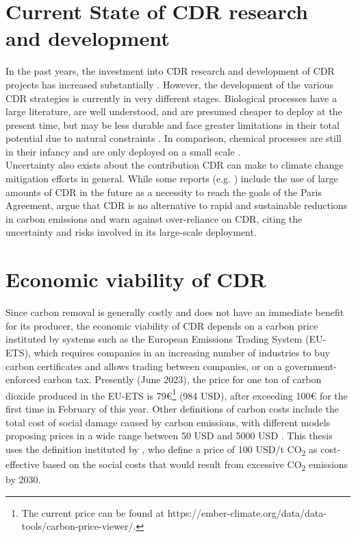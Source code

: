 \section{Current State of CDR research and development}
In the past years, the investment into CDR research and development of CDR projects has increased substantially \parencite{Smith2023TheEdition}. However, the development of the various CDR strategies is currently in very different stages. Biological processes have a large literature, are well understood, and are presumed cheaper to deploy at the present time, but may be less durable and face greater limitations in their total potential due to natural constraints \parencite{Fuss2018NegativeEffects}. In comparison, chemical processes are still in their infancy and are only deployed on a small scale \parencite{Smith2023TheEdition}.\\
Uncertainty also exists about the contribution CDR can make to climate change mitigation efforts in general. While some reports (e.g. \textcite{NAS2018NegativeAgenda}) include the use of large amounts of CDR in the future as a necessity to reach the goals of the Paris Agreement, \textcite{Fuss2018NegativeEffects} argue that CDR is no alternative to rapid and sustainable reductions in carbon emissions and warn against over-reliance on CDR, citing the uncertainty and risks involved in its large-scale deployment.\\
\section{Economic viability of CDR}
Since carbon removal is generally costly and does not have an immediate benefit for its producer, the economic viability of CDR depends on a carbon price instituted by systems such as the European Emissions Trading System (EU-ETS), which requires companies in an increasing number of industries to buy carbon certificates and allows trading between companies, or on a government-enforced carbon tax. Presently (June 2023), the price for one ton of carbon dioxide produced in the EU-ETS is 79€\footnote{The current price can be found at https://ember-climate.org/data/data-tools/carbon-price-viewer/.} (984 USD), after exceeding 100€ for the first time in February of this year. Other definitions of carbon costs include the total cost of social damage caused by carbon emissions, with different models proposing prices in a wide range between 50 USD and 5000 USD \parencite{Kikstra2021TheVariability}. This thesis uses the definition instituted by \textcite{Griscom2017NaturalSolutions}, who define a price of 100 USD/t CO\textsubscript{2} as cost-effective based on the social costs that would result from excessive CO\textsubscript{2} emissions by 2030.